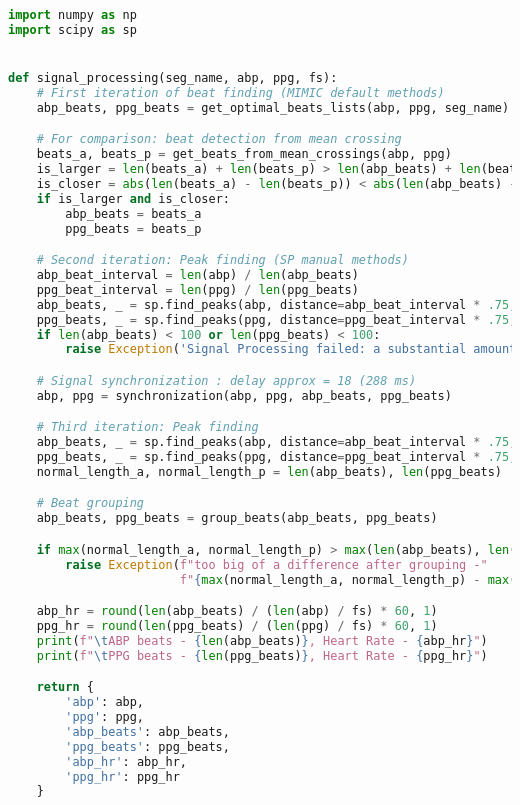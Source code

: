 \begin{lstlisting}[language=Python,label={lst:sp.py}, basicstyle=\scriptsize]
import numpy as np
import scipy as sp


def signal_processing(seg_name, abp, ppg, fs):
    # First iteration of beat finding (MIMIC default methods)
    abp_beats, ppg_beats = get_optimal_beats_lists(abp, ppg, seg_name)

    # For comparison: beat detection from mean crossing
    beats_a, beats_p = get_beats_from_mean_crossings(abp, ppg)
    is_larger = len(beats_a) + len(beats_p) > len(abp_beats) + len(beats_p)
    is_closer = abs(len(beats_a) - len(beats_p)) < abs(len(abp_beats) - len(ppg_beats))
    if is_larger and is_closer:
        abp_beats = beats_a
        ppg_beats = beats_p

    # Second iteration: Peak finding (SP manual methods)
    abp_beat_interval = len(abp) / len(abp_beats)
    ppg_beat_interval = len(ppg) / len(ppg_beats)
    abp_beats, _ = sp.find_peaks(abp, distance=abp_beat_interval * .75, prominence=0.5)
    ppg_beats, _ = sp.find_peaks(ppg, distance=ppg_beat_interval * .75, prominence=0.01)
    if len(abp_beats) < 100 or len(ppg_beats) < 100:
        raise Exception('Signal Processing failed: a substantial amount of beats not found')

    # Signal synchronization : delay approx = 18 (288 ms)
    abp, ppg = synchronization(abp, ppg, abp_beats, ppg_beats)

    # Third iteration: Peak finding
    abp_beats, _ = sp.find_peaks(abp, distance=abp_beat_interval * .75, prominence=0.5)
    ppg_beats, _ = sp.find_peaks(ppg, distance=ppg_beat_interval * .75, prominence=0.01)
    normal_length_a, normal_length_p = len(abp_beats), len(ppg_beats)

    # Beat grouping
    abp_beats, ppg_beats = group_beats(abp_beats, ppg_beats)

    if max(normal_length_a, normal_length_p) > max(len(abp_beats), len(ppg_beats)) * 1.05:
        raise Exception(f"too big of a difference after grouping -"
                        f"{max(normal_length_a, normal_length_p) - max(len(abp_beats), len(ppg_beats))}")

    abp_hr = round(len(abp_beats) / (len(abp) / fs) * 60, 1)
    ppg_hr = round(len(ppg_beats) / (len(ppg) / fs) * 60, 1)
    print(f"\tABP beats - {len(abp_beats)}, Heart Rate - {abp_hr}")
    print(f"\tPPG beats - {len(ppg_beats)}, Heart Rate - {ppg_hr}")

    return {
        'abp': abp,
        'ppg': ppg,
        'abp_beats': abp_beats,
        'ppg_beats': ppg_beats,
        'abp_hr': abp_hr,
        'ppg_hr': ppg_hr
    }



\end{lstlisting}
